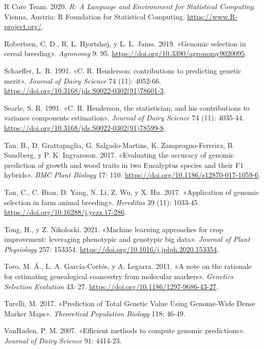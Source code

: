 \documentclass[11pt,spanish,a4paper,oneside,]{book} %
\begin{document}
\leavevmode\hypertarget{ref-cite:52}{}%
R Core Team. 2020. \emph{R: A Language and Environment for Statistical Computing}. Vienna, Austria: R Foundation for Statistical Computing. \url{https://www.R-project.org/}.

\leavevmode\hypertarget{ref-cite:63}{}%
Robertsen, C. D., R. L. Hjortshøj, y L. L. Janss. 2019. «Genomic selection in cereal breeding». \emph{Agronomy} 9: 95. \url{https://doi.org/10.3390/agronomy9020095}.

\leavevmode\hypertarget{ref-cite:27}{}%
Schaeffer, L. R. 1991. «C. R. Henderson: contributions to predicting genetic merit». \emph{Journal of Dairy Science} 74 (11): 4052-66. \url{https://doi.org/10.3168/jds.S0022-0302(91)78601-3}.

\leavevmode\hypertarget{ref-cite:29}{}%
Searle, S. R. 1991. «C. R. Henderson, the statistician; and his contributions to variance components estimation». \emph{Journal of Dairy Science} 74 (11): 4035-44. \url{https://doi.org/10.3168/jds.S0022-0302(91)78599-8}.

\leavevmode\hypertarget{ref-cite:79}{}%
Tan, B., D. Grattapaglia, G. Salgado-Martins, K. Zamprogno-Ferreira, B. Sundberg, y P. K. Ingvarsson. 2017. «Evaluating the accuracy of genomic prediction of growth and wood traits in two Eucalyptus species and their F1 hybrids». \emph{BMC Plant Biology} 17: 110. \url{https://doi.org/10.1186/s12870-017-1059-6}.

\leavevmode\hypertarget{ref-cite:34}{}%
Tan, C., C. Bian, D. Yang, N. Li, Z. Wu, y X. Hu. 2017. «Application of genomic selection in farm animal breeding». \emph{Hereditas} 39 (11): 1033-45. \url{https://doi.org/10.16288/j.yczz.17-286}.

\leavevmode\hypertarget{ref-cite:7}{}%
Tong, H., y Z. Nikoloski. 2021. «Machine learning approaches for crop improvement: leveraging phenotypic and genotypic big data». \emph{Journal of Plant Physiology} 257: 153354. \url{https://doi.org/10.1016/j.jplph.2020.153354}.

\leavevmode\hypertarget{ref-cite:71}{}%
Toro, M. Á., L. A. García-Cortés, y A. Legarra. 2011. «A note on the rationale for estimating genealogical coancestry from molecular markers». \emph{Genetics Selection Evolution} 43: 27. \url{https://doi.org/10.1186/1297-9686-43-27}.

\leavevmode\hypertarget{ref-cite:9}{}%
Turelli, M. 2017. «Prediction of Total Genetic Value Using Genome-Wide Dense Marker Maps». \emph{Theoretical Population Biology} 118: 46-49.

\leavevmode\hypertarget{ref-cite:39}{}%
VanRaden, P. M. 2007. «Efficient methods to compute genomic predictions». \emph{Journal of Dairy Science} 91: 4414-23.
\end{document}
